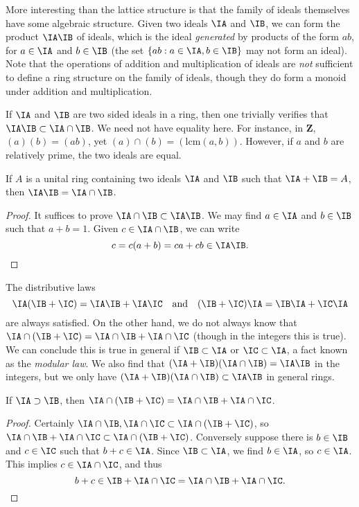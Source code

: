 More interesting than the lattice structure is that the family of ideals themselves have some algebraic structure. Given two ideals $\IA$ and $\IB$, we can form the product $\IA \IB$ of ideals, which is the ideal \emph{generated} by products of the form $ab$, for $a \in \IA$ and $b \in \IB$ (the set $\{ ab : a \in \IA, b \in \IB \}$ may not form an ideal). Note that the operations of addition and multiplication of ideals are {\it not} sufficient to define a ring structure on the family of ideals, though they do form a monoid under addition and multiplication.

If $\IA$ and $\IB$ are two sided ideals in a ring, then one trivially verifies that $\IA \IB \subset \IA \cap \IB$. We need not have equality here. For instance, in $\mathbf{Z}$, $(a)(b) = (ab)$, yet $(a) \cap (b) = (\text{lcm}(a,b))$. However, if $a$ and $b$ are relatively prime, the two ideals are equal.

\begin{lemma}
    If $A$ is a unital ring containing two ideals $\IA$ and $\IB$ such that $\IA + \IB = A$, then $\IA \IB = \IA \cap \IB$.
\end{lemma}
\begin{proof}
    It suffices to prove $\IA \cap \IB \subset \IA \IB$. We may find $a \in \IA$ and $b \in \IB$ such that $a + b = 1$. Given $c \in \IA \cap \IB$, we can write
    \[ c = c(a + b) = ca + cb \in \IA \IB. \qedhere \]
\end{proof}

The distributive laws
%
\[ \IA(\IB + \IC) = \IA \IB + \IA \IC \quad\text{and}\quad (\IB + \IC) \IA = \IB \IA + \IC \IA \]
%
are always satisfied. On the other hand, we do not always know that $\IA \cap (\IB + \IC) = \IA \cap \IB + \IA \cap \IC$ (though in the integers this is true). We can conclude this is true in general if $\IB \subset \IA$ or $\IC \subset \IA$, a fact known as the {\it modular law}. We also find that $(\IA + \IB)(\IA \cap \IB) = \IA\IB$ in the integers, but we only have $(\IA + \IB)(\IA \cap \IB) \subset \IA\IB$ in general rings.

\begin{theorem}
    If $\IA \supset \IB$, then $\IA \cap (\IB + \IC) = \IA \cap \IB + \IA \cap \IC$.
\end{theorem}
\begin{proof}
    Certainly $\IA \cap \IB, \IA \cap \IC \subset \IA \cap (\IB + \IC)$, so $\IA \cap \IB + \IA \cap \IC \subset \IA \cap (\IB + \IC)$. Conversely suppose there is $b \in \IB$ and $c \in \IC$ such that $b + c \in \IA$. Since $\IB \subset \IA$, we find $b \in \IA$, so $c \in \IA$. This implies $c \in \IA \cap \IC$, and thus
    \[ b + c \in \IB + \IA \cap \IC = \IA \cap \IB + \IA \cap \IC. \qedhere \]
\end{proof}

